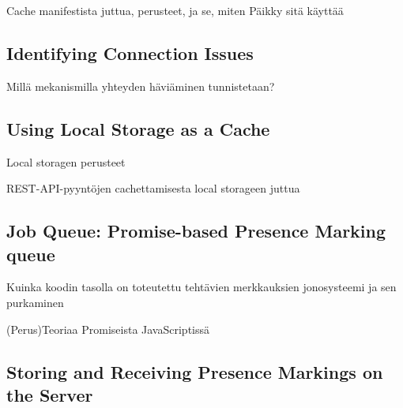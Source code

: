 



Cache manifestista juttua, perusteet, ja se, miten Päikky sitä käyttää




\subsection{Identifying Connection Issues}
Millä mekanismilla yhteyden häviäminen tunnistetaan?




\subsection{Using Local Storage as a Cache}
Local storagen perusteet

REST-API-pyyntöjen cachettamisesta local storageen juttua



\subsection{Job Queue: Promise-based Presence Marking queue}
Kuinka koodin tasolla on toteutettu tehtävien merkkauksien jonosysteemi ja sen purkaminen

(Perus)Teoriaa Promiseista JavaScriptissä


\subsection{Storing and Receiving Presence Markings on the Server}







